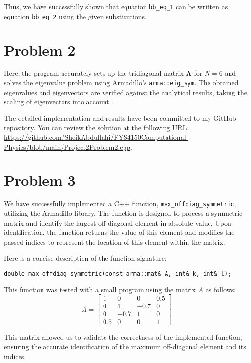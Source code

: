 \documentclass{article}
\begin{document}
Thus, we have successfully shown that equation \texttt{bb\_eq\_1} can be written as equation \texttt{bb\_eq\_2} using the given substitutions.



\section*{Problem 2}

Here, the program accurately sets up the tridiagonal matrix \( \mathbf{A} \) for \( N=6 \) and solves the eigenvalue problem using Armadillo's \texttt{arma::eig\_sym}. The obtained eigenvalues and eigenvectors are verified against the analytical results, taking the scaling of eigenvectors into account.

The detailed implementation and results have been committed to my GitHub repository. You can review the solution at the following URL: \url{https://github.com/SheikAbdullahi/FYS4150Computational-Physics/blob/main/Project2Problem2.cpp}.

\section*{Problem 3}

We have successfully implemented a C++ function, \texttt{max\_offdiag\_symmetric}, utilizing the Armadillo library. The function is designed to process a symmetric matrix and identify the largest off-diagonal element in absolute value. Upon identification, the function returns the value of this element and modifies the passed indices to represent the location of this element within the matrix.

Here is a concise description of the function signature:
\begin{verbatim}
double max_offdiag_symmetric(const arma::mat& A, int& k, int& l);
\end{verbatim}

This function was tested with a small program using the matrix \( A \) as follows:
\[
A = \begin{bmatrix}
    1 & 0 & 0 & 0.5 \\
    0 & 1 & -0.7 & 0 \\
    0 & -0.7 & 1 & 0 \\
    0.5 & 0 & 0 & 1
\end{bmatrix}
\]

This matrix allowed us to validate the correctness of the implemented function, ensuring the accurate identification of the maximum off-diagonal element and its indices.
\end{document}
